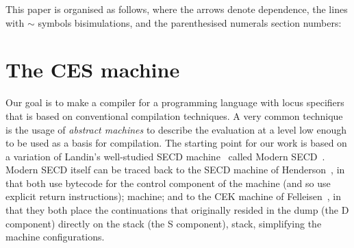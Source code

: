 \documentclass{article}
\theoremstyle{definition}
\newcommand{\DCESHi}{DCESH$_1$}
\newcommand{\DCESHn}{DCESH}
\begin{document}
This paper is organised as
follows, where the arrows denote dependence, the lines with
$\sim$ symbols bisimulations, and the parenthesised numerals section numbers:
\begin{center}
\end{center}


\section{The CES machine} \label{section:CES}
Our goal is to make a compiler for a programming language with
locus specifiers that is based on conventional compilation techniques.
A very common technique is the usage of \emph{abstract machines} to describe
the evaluation at a level low enough to be used as a basis for compilation.
The starting point for our work is based on a variation of Landin's
well-studied SECD machine~\cite{Landin64} called Modern SECD~\cite{ModernSECD}.
Modern SECD itself can be traced back to the SECD machine of
Henderson~\cite{DBLP:books/daglib/0068837}, in that both use bytecode for the
control component of the 
\iffullversion
machine
(and so use explicit return instructions);
\else
machine;
\fi
and
to the CEK machine of Felleisen~\cite{Felleisen:1986:CEK}, in that they both
place the continuations that originally resided in the dump
\iffullversion
(the D component)
\fi
directly on the
\iffullversion
stack (the S component),
\else
stack,
\fi
simplifying the machine configurations.
\end{document}

